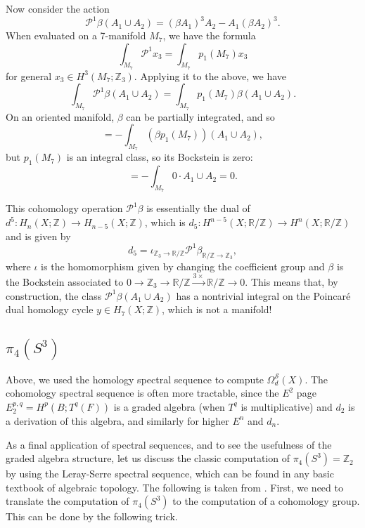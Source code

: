 \documentclass[12pt]{article}
\numberwithin{equation}{section}
\numberwithin{figure}{section}
\theoremstyle{remark}
\def\bR{\mathbb{R}}
\def\bZ{\mathbb{Z}}
\def\cP{\mathcal{P}}
\def\cS{\mathcal{S}}
\begin{document}
Now consider the action \begin{equation}
\cP^1 \beta (A_1 \cup A_2) 
= (\beta A_1)^3 A_2 - A_1 (\beta A_2)^3.
\end{equation} 
When evaluated on a 7-manifold $M_7$, we have the formula \begin{equation}
\int_{M_7} \cP^1 x_3 = \int_{M_7} p_1(M_7) x_3
\end{equation} for general $x_3\in H^3(M_7;\bZ_3)$. Applying it to the above, we have \begin{equation}
\int_{M_7} \cP^1 \beta(A_1\cup A_2) = \int_{M_7} p_1(M_7) \beta(A_1\cup A_2).
\end{equation}
On an oriented manifold, $\beta$ can be partially integrated, and so \begin{equation}
= -\int_{M_7} (\beta p_1(M_7) ) (A_1\cup A_2),
\end{equation} but $p_1(M_7)$ is an integral class, so its Bockstein is zero: \begin{equation}
= -\int_{M_7} 0\cdot A_1\cup A_2 = 0.
\end{equation}


This cohomology operation $\cP^1\beta$ is essentially the dual of $d^5: H_n(X;\bZ)\to H_{n-5}(X;\bZ)$,
which is $d_5:H^{n-5}(X;\bR/\bZ)\to H^{n}(X;\bR/\bZ)$ and is given by \begin{equation}
d_5 = \iota_{\bZ_3\to \bR/\bZ}\cP^1 \beta_{\bR/\bZ\to\bZ_3},
\end{equation} where $\iota$ is the homomorphism given by changing the coefficient group
and $\beta$ is the Bockstein associated to $ 0\to \bZ_3\to  \bR/\bZ \xrightarrow{3\times} \bR/\bZ\to 0$.
This means that, by construction, the class $\cP^1\beta(A_1\cup A_2)$ has a nontrivial  integral
on the Poincar\'e dual homology cycle $y\in H_7(X;\bZ)$, which is not a manifold!

\subsection{$\pi_4(S^3)$}

Above, we used the homology spectral sequence to compute $\Omega^\cS_d(X)$.
The cohomology spectral sequence is often more tractable,
since the $E^2$ page $E_2^{p,q} = H^p(B;T^q(F))$ is a graded algebra (when $T^q$ is multiplicative)
and $d_2$ is a derivation of this algebra,
and similarly for higher $E^n$ and $d_n$.

As a final application of spectral sequences, and to see the usefulness of the graded algebra structure,
let us discuss the classic computation of $\pi_4(S^3)=\bZ_2$ by using the Leray-Serre spectral sequence,
which can be found in any basic textbook of algebraic topology.
The following is taken from \cite[Appendix B]{Saito:2025idl}.
First, we need to translate the computation of $\pi_4(S^3)$ 
to the computation of a cohomology group. This can be done by the following trick.
\end{document}
